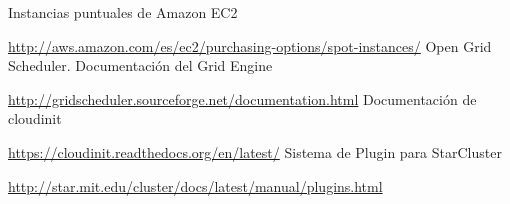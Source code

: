 \documentclass{article}
\begin{document}
\clearpage

{\setlength{\parskip}{0mm} \listoftables } %
{\setlength{\parskip}{0mm} \listoffigures} %

\clearpage

\renewcommand{\bibname}{Referencias}
\begin{thebibliography}{99}
Instancias puntuales de Amazon EC2

\url{http://aws.amazon.com/es/ec2/purchasing-options/spot-instances/}
Open Grid Scheduler. Documentación del Grid Engine

\url{http://gridscheduler.sourceforge.net/documentation.html}
Documentación de cloudinit

\url{https://cloudinit.readthedocs.org/en/latest/}
Sistema de Plugin para StarCluster

\url{http://star.mit.edu/cluster/docs/latest/manual/plugins.html}
\end{thebibliography}
\end{document}

